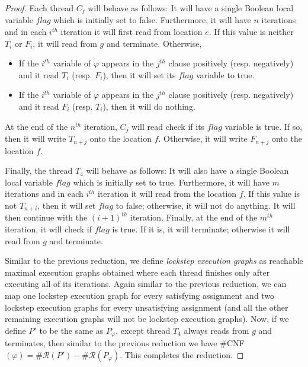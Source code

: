 \documentclass[acmsmall]{acmart}
\begin{document}
\begin{proof}
    Each thread $C_j$ will behave as follows: It will have a single Boolean local variable $flag$ which is initially set to false. Furthermore, it will have $n$ iterations
    and in each $i^{th}$ iteration it will first read from location $e$.
    If this value is neither $T_i$ or $F_i$, it will read from $g$ and terminate.
    Otherwise, 
    \begin{itemize}
        \item If the $i^{th}$ variable of $\varphi$ appears in the $j^{th}$ clause positively (resp. negatively) and it read $T_i$ (resp. $F_i$), then it will 
        set its $flag$ variable to true.
        \item If the $i^{th}$ variable of $\varphi$ appears in the $j^{th}$ clause positively (resp. negatively) and it read $F_i$ (resp. $T_i$), then it will do nothing.
    \end{itemize}
    At the end of the $n^{th}$ iteration, $C_j$ will read check if its $flag$ variable is true.
    If so, then it will write $T_{n+j}$ onto the location $f$.
    Otherwise, it will write $F_{n+j}$ onto the location $f$.

    Finally, the thread $T_4$ will behave as follows: It will also have a single Boolean local variable $flag$ which is initially set to true. Furthermore, it will have $m$ iterations
    and in each $i^{th}$ iteration it will read from the location $f$.
    If this value is not $T_{n+i}$, then it will set $flag$ to false; otherwise, it will not do anything. It will then continue
    with the $(i+1)^{th}$ iteration.
    Finally, at the end of the $m^{th}$ iteration, it will check if $flag$ is true. 
    If it is, it will terminate; otherwise it will read from $g$ and terminate.

    Similar to the previous reduction, we define \emph{lockstep execution graphs}
    as reachable maximal execution graphs obtained where each thread finishes only after executing
    all of its iterations. Again similar to the previous reduction, we can 
    map one lockstep execution graph for every satisfying assignment
    and two lockstep execution graphs for every unsatisfying assignment
    (and all the other remaining execution graphs will not be lockstep execution graphs).
    Now, if we define $P'$ to be the same as $P_\varphi$, except thread $T_4$ always
    reads from $g$ and terminates, then similar to the previous reduction
    we have $\#$CNF$(\varphi) = \#\mathcal{R}(P') - \#\mathcal{R}(P_\varphi)$.
    This completes the reduction.
\end{proof}
\end{document}
